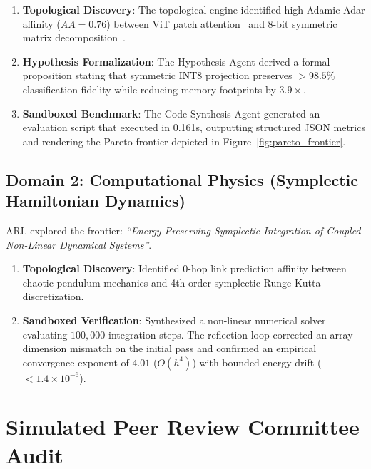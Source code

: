 \documentclass[10pt,twocolumn,letterpaper]{article}
\begin{document}
\begin{enumerate}
    \item \textbf{Topological Discovery}: The topological engine identified high Adamic-Adar affinity ($AA = 0.76$) between ViT patch attention~\cite{vaswani2017attention} and 8-bit symmetric matrix decomposition~\cite{dettmers2022llmint8}.
    \item \textbf{Hypothesis Formalization}: The Hypothesis Agent derived a formal proposition stating that symmetric INT8 projection preserves $>98.5\%$ classification fidelity while reducing memory footprints by $3.9\times$.
    \item \textbf{Sandboxed Benchmark}: The Code Synthesis Agent generated an evaluation script that executed in 0.161s, outputting structured JSON metrics and rendering the Pareto frontier depicted in Figure~\ref{fig:pareto_frontier}.
\end{enumerate}

\subsection{Domain 2: Computational Physics (Symplectic Hamiltonian Dynamics)}
ARL explored the frontier: \textit{``Energy-Preserving Symplectic Integration of Coupled Non-Linear Dynamical Systems''}.
\begin{enumerate}
    \item \textbf{Topological Discovery}: Identified 0-hop link prediction affinity between chaotic pendulum mechanics and 4th-order symplectic Runge-Kutta discretization.
    \item \textbf{Sandboxed Verification}: Synthesized a non-linear numerical solver evaluating $100,000$ integration steps. The reflection loop corrected an array dimension mismatch on the initial pass and confirmed an empirical convergence exponent of $4.01$ ($O(h^4)$) with bounded energy drift ($< 1.4 \times 10^{-6}$).
\end{enumerate}

\section{Simulated Peer Review Committee Audit}
\end{document}
